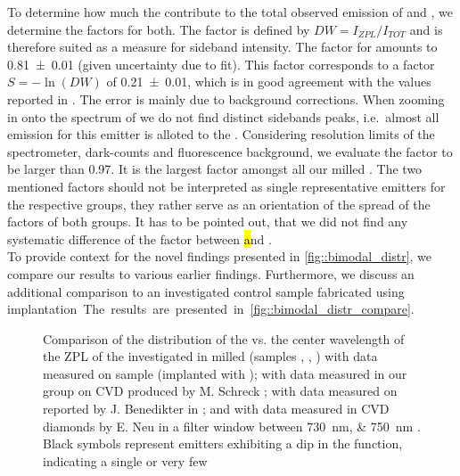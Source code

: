 	To determine how much the \ZPLs contribute to the total observed emission of \emnarrow and \embroad, we determine the \db factors for both.
	The \db factor is defined by $DW = I_{ZPL}/I_{TOT}$ and is therefore suited as a measure for sideband intensity.
	The \db factor for \emnarrow amounts to \num[separate-uncertainty]{0.81(1)} (given uncertainty due to fit).
	This \db factor corresponds to a \hr factor $S =- \ln{(DW)}$ \cite{Walker1979} of \num[separate-uncertainty]{0.21(1)}, which is in good agreement with the values reported in \cite{Neu2011b}.
	The error is mainly due to background corrections.
	When zooming in onto the spectrum of \embroad we do not find distinct sidebands peaks, i.e.\ almost all emission for this emitter is alloted to the \ZPL.
	Considering resolution limits of the spectrometer, dark-counts and fluorescence background, we evaluate the \db factor to be larger than \num[separate-uncertainty]{0.97}.
	It is the largest \db factor amongst all our milled \sivs.
	The two mentioned \db factors should not be interpreted as single representative emitters for the respective groups, they rather serve as an orientation of the spread of the \db factors of both groups.
	It has to be pointed out, that we did not find any systematic difference of the \db factor between \hl and \vl.
	\\
	To provide context for the novel findings presented in \autoref{fig::bimodal_distr}, we compare our results to various earlier findings.
	Furthermore, we discuss an additional comparison to an investigated control sample fabricated using \si implantation.
	The results are presented in \autoref{fig::bimodal_distr_compare}.


	\begin{figure}[htp]
		\centering
		\caption[Comparison of obtained \siv \lws with available data sources]{Comparison of the distribution of the \lw vs. the center wavelength of the ZPL of the investigated \sivs in milled \nds (samples \insituF, \insituS, \insituH) with data measured on sample \implantedTao (implanted with \Si); with data measured in our group on CVD \nds produced by M. Schreck \cite{Neu2011b}; with data measured on \nds reported by J. Benedikter in \cite{Benedikter2017a}; and with data measured in CVD diamonds by E. Neu in a filter window between \SIlist{730; 750}{nm} \cite{Neu2012}. Black symbols represent emitters exhibiting a dip in the \gtz function, indicating a single or very few \sivs}
		\label{fig::bimodal_distr_compare}
	\end{figure}


